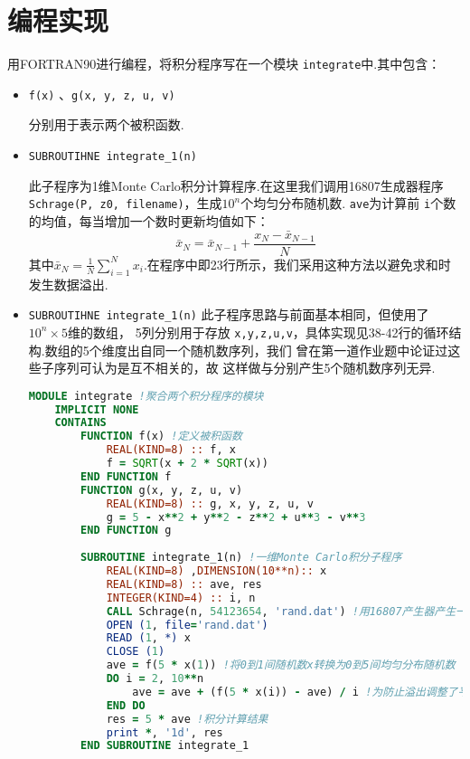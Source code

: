 \documentclass[12pt,a4paper,utf8]{ctexart}
\begin{document}
\section{编程实现}

用FORTRAN90进行编程，将积分程序写在一个模块
\texttt{integrate}中.其中包含：
\begin{itemize}
    \item \texttt{f(x)} 、\texttt{g(x, y, z, u, v)}
        
        分别用于表示两个被积函数.
    \item \texttt{SUBROUTIHNE integrate\_1(n)}

        此子程序为1维Monte Carlo积分计算程序.在这里我们调用16807生成器程序 
        \texttt{Schrage(P, z0, filename)}，生成$10^n$个均匀分布随机数.
        \texttt{ave}为计算前
        \texttt{i}个数的均值，每当增加一个数时更新均值如下：
        \begin{equation}
            \bar{x}_N = \bar{x}_{N-1} + \frac{x_N - \bar{x}_{N-1}}{N}
        \end{equation}
        其中$\bar{x}_N = \frac{1}{N}
        \sum_{i=1}^{N}x_i$.在程序中即23行所示，我们采用这种方法以避免求和时
        发生数据溢出.
    \item \texttt{SUBROUTIHNE integrate\_1(n)}
        此子程序思路与前面基本相同，但使用了$10^n \times 5$维的数组，
        5列分别用于存放
        \texttt{x,y,z,u,v}，具体实现见38-42行的循环结构.数组的5个维度出自同一个随机数序列，我们
        曾在第一道作业题中论证过这些子序列可认为是互不相关的，故
        这样做与分别产生5个随机数序列无异.
\begin{framed}
\begin{lstlisting}[language=Fortran]
MODULE integrate !聚合两个积分程序的模块
    IMPLICIT NONE
    CONTAINS
        FUNCTION f(x) !定义被积函数
            REAL(KIND=8) :: f, x
            f = SQRT(x + 2 * SQRT(x))
        END FUNCTION f
        FUNCTION g(x, y, z, u, v)
            REAL(KIND=8) :: g, x, y, z, u, v
            g = 5 - x**2 + y**2 - z**2 + u**3 - v**3
        END FUNCTION g
        
        SUBROUTINE integrate_1(n) !一维Monte Carlo积分子程序
            REAL(KIND=8) ,DIMENSION(10**n):: x
            REAL(KIND=8) :: ave, res
            INTEGER(KIND=4) :: i, n
            CALL Schrage(n, 54123654, 'rand.dat') !用16807产生器产生一定数目的均匀随机数
            OPEN (1, file='rand.dat')
            READ (1, *) x
            CLOSE (1)
            ave = f(5 * x(1)) !将0到1间随机数x转换为0到5间均匀分布随机数
            DO i = 2, 10**n
                ave = ave + (f(5 * x(i)) - ave) / i !为防止溢出调整了平均值求法
            END DO
            res = 5 * ave !积分计算结果
            print *, '1d', res
        END SUBROUTINE integrate_1


\end{lstlisting}
\end{framed}
\end{itemize}
\end{document}
